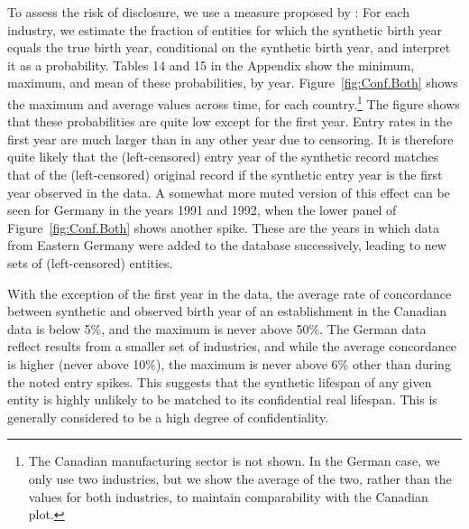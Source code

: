 \documentclass[10pt]{article}
\begin{document}
To assess the risk of disclosure, we use a measure proposed by \textcite{KinneyEtAl2011}: For each industry, we estimate the fraction of entities for which the synthetic birth year equals the true birth year, conditional on the synthetic birth year, and interpret it as a probability. Tables 14 and 15 %
in the  Appendix show the minimum, maximum, and mean of these probabilities, by year. Figure~\ref{fig:Conf.Both} shows the maximum and average values across time, for each country.\footnote{The Canadian manufacturing sector is not shown. In the German case, we only use two industries, but we show the average of the two, rather than the values for both industries, to maintain comparability with the Canadian plot.} The figure shows that these probabilities are quite low except for the first year. Entry rates in the first year are much larger than in any other year due to censoring. It is therefore quite likely that the (left-censored) entry year of the synthetic record matches that of the (left-censored) original record if the synthetic entry year is the first year observed in the data. A somewhat more muted version of this effect can be seen for Germany in the years 1991 and 1992, when the lower panel of Figure~\ref{fig:Conf.Both} shows another spike. These are the years in which data from Eastern Germany were added to the database successively, leading to new sets of (left-censored) entities. 

With the exception of the first year in the data, the average rate of concordance between synthetic and observed birth year of an establishment in the Canadian data is below 5\%, and the maximum is never above 50\%. The German data reflect results from a smaller set of industries, and while the average concordance is higher (never above 10\%), the maximum is never above 6\% other than during the noted entry spikes. This suggests that the synthetic lifespan of any given entity is highly unlikely to be matched to its confidential real lifespan. This is generally considered to be a high degree of confidentiality. 
\end{document}

